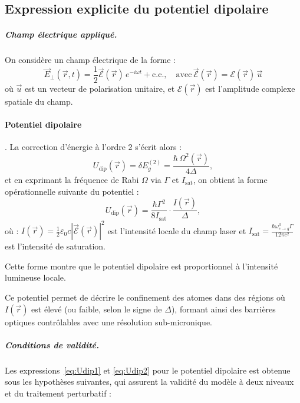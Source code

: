 \bigskip

\subsection{Expression explicite du potentiel dipolaire}

\subparagraph{Champ électrique appliqué.}
On considère un champ électrique de la forme :
\begin{equation}
\vec{E}_\perp(\vec{r},t) = \frac{1}{2} \vec{\mathcal{E}}(\vec{r}) \, e^{-i\omega t} + \text{c.c.}, \quad \mbox{avec}  \, \vec{\mathcal{E}}(\vec{r}) =  {\mathcal{E}}(\vec{r})\, \vec{u}
\end{equation}
où \( \vec{u} \) est un vecteur de polarisation unitaire, et \( {\mathcal{E}}(\vec{r}) \) est l’amplitude complexe spatiale du champ.


\paragraph{Potentiel dipolaire}.
La correction d’énergie à l’ordre 2 s’écrit alors :
\begin{equation}
	U_{\mathrm{dip}}(\vec{r}) = \delta E_g^{(2)} = \frac{\hbar \, \Omega^2(\vec{r})}{4 \Delta},\label{eq:Udip1}
\end{equation}
et en exprimant la fréquence de Rabi \( \Omega \) via \( \Gamma \) et \( I_{\mathrm{sat}} \), on obtient la forme opérationnelle suivante du potentiel :
\begin{equation}
	U_{\mathrm{dip}}(\vec{r}) = \frac{\hbar \Gamma^2}{8 I_{\mathrm{sat}}} \cdot \frac{I(\vec{r})}{\Delta},
	\label{eq:Udip2}
\end{equation}
où : \( I(\vec{r}) = \frac{1}{2} \varepsilon_0 c |\vec{\mathcal{E}}(\vec{r})|^2\) est l’intensité locale du champ laser et \( I_{\mathrm{sat}}  = \frac{\hbar \omega_{e \rightarrow g}^3 \Gamma}{12 \pi c^2}\) est l’intensité de saturation.


Cette forme montre que le potentiel dipolaire est proportionnel à l’intensité lumineuse locale. 


Ce potentiel permet de décrire le confinement des atomes dans des régions où \( I(\vec{r}) \) est élevé (ou faible, selon le signe de \( \Delta \)), formant ainsi des barrières optiques contrôlables avec une résolution sub-micronique.


\subparagraph{Conditions de validité.}

Les expressions~\eqref{eq:Udip1} et \eqref{eq:Udip2}  pour le potentiel dipolaire est obtenue sous les hypothèses suivantes, qui assurent la validité du modèle à deux niveaux et du traitement perturbatif :

